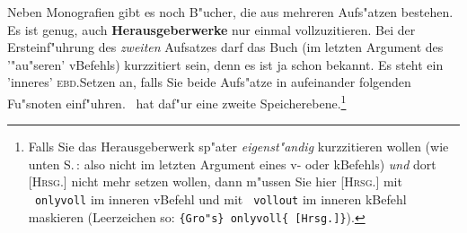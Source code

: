 \documentclass[12pt,a4paper]{article}
\newcommand{\pbs}{\string\ \unskip}
\newcommand{\bs}{\protect\pbs}
\begin{document}
Neben Monografien gibt es noch B"ucher, die aus mehreren Aufs"atzen bestehen. 
Es ist genug, auch \textbf{Herausgeberwerke} nur einmal vollzuzitieren. Bei der 
Ersteinf"uhrung des \textit{zweiten} Aufsatzes darf das Buch (im letzten 
Argument des '"au"seren' v\fhy Befehls) kurzzitiert sein, denn es ist ja schon 
bekannt. Es steht ein 'inneres' \textsc{ebd.}\hy Setzen an, falls Sie beide 
Aufs"atze in aufeinander folgenden Fu"snoten einf"uhren. \BibArts\ 
hat daf"ur eine zweite Speicherebene.\footnote{Falls Sie das Herausgeberwerk 
sp"ater \textit{eigenst"andig} kurzzitieren wollen (wie unten S.\,\pageref{MEhlert}:
also nicht im letzten Argument eines v- oder k\fhy Befehls) 
\textit{und} dort \textsc{[Hrsg.]} nicht mehr setzen wollen, dann m"ussen 
Sie hier \textsc{[Hrsg.]} mit \texttt{\bs onlyvoll} im inneren v\fhy Befehl und mit 
\texttt{\bs vollout} im inneren k\fhy Befehl maskieren 
(Leerzeichen so: \texttt{\{Gro"s\}\bs onlyvoll\{ [Hrsg.]\}}).}
\end{document}
